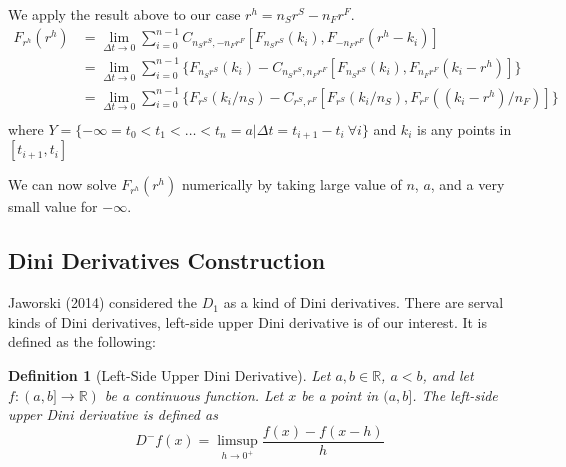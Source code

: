 \documentclass[11pt, leqno]{article}
\newtheorem{definition}{Definition}[section]
\numberwithin{equation}{section}
\begin{document}
We apply the result above to our case $r^h = n_S r^S - n_F r^F$.
\begin{align*}
    F_{r^h}(r^h)
                &= \lim_{\Delta t \rightarrow 0}
                   \sum^{n-1}_{i=0} C_{n_S r^S, -n_F r^F}[F_{n_S r^S}(k_i), F_{-n_F r^F}(r^h-k_i)] \nonumber \\
                &= \lim_{\Delta t \rightarrow 0}
                   \sum^{n-1}_{i=0} \{F_{n_S r^S}(k_i) - C_{n_S r^S, n_F r^F}[F_{n_S r^S}(k_i), F_{n_F r^F}(k_i-r^h)]\}\\
                &= \lim_{\Delta t \rightarrow 0}
                       \sum^{n-1}_{i=0} \{F_{r^S}(k_i/n_S) - C_{r^S, r^F}[F_{r^S}(k_i/n_S), F_{r^F}((k_i-r^h)/n_F)]\}\\
\end{align*}
        where $Y = \{-\infty= t_0 < t_1<\dots<t_n=a| \Delta t = t_{i+1}-t_i~\forall i\}$ and $k_i$ is any points in $[t_{i+1},t_i]$ \newline

We can now solve $F_{r^h}(r^h)$ numerically by taking large value of $n$, $a$, and a very small value for $-\infty$.
\subsection{Dini Derivatives Construction}\label{sec:Dini}


Jaworski (2014) considered the $D_1$ as a kind of Dini derivatives.
There are serval kinds of Dini derivatives, left-side upper Dini derivative is of our interest. It is defined as the following:

\theoremstyle{definition}
\begin{definition}[Left-Side Upper Dini Derivative]
    Let $a,b \in \mathbb{R}$, $a < b$, and let $f:(a,b] \rightarrow \mathbb{R})$ be a continuous function.
    Let $x$ be a point in $(a,b]$.
    The left-side upper Dini derivative is defined as
    \[D^- f(x) = \limsup_{h \rightarrow 0^+} \frac{f(x)-f(x-h)}{h}\]
\end{definition}
\end{document}
